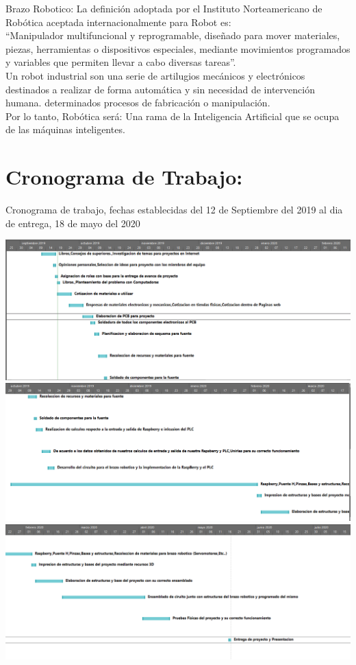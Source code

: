 \documentclass[14pt,a4paper]{article}
\begin{document}
Brazo Robotico:
La definición adoptada por el Instituto Norteamericano de Robótica aceptada internacionalmente para Robot es:\\

“Manipulador multifuncional y reprogramable, diseñado para mover materiales, piezas, herramientas o dispositivos especiales, mediante movimientos programados y variables que permiten llevar a cabo diversas tareas”.\\
Un robot industrial son una serie de artilugios mecánicos y electrónicos destinados a realizar de forma automática y sin necesidad de intervención humana. determinados procesos de fabricación o manipulación.\\
Por lo tanto, Robótica será:  Una rama de la Inteligencia Artificial que se ocupa de las máquinas inteligentes.
\newpage
\section{Cronograma de Trabajo:}
Cronograma de trabajo, fechas establecidas del 12 de  Septiembre del 2019 al dia de entrega, 18 de mayo del 2020

\begin{center}
\includegraphics[width=17cm]{CronogramaTrabajo/1.png}\\

\includegraphics[width=17cm]{CronogramaTrabajo/2.png}\\

\includegraphics[width=17cm]{CronogramaTrabajo/3.png}  
\end{center}
\newpage
\end{document}
